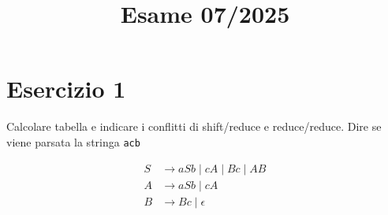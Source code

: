 \endofdump

\usetikzlibrary{external}
\tikzexternalize[prefix=tikz/]

\title{Esame 07/2025}


\maketitle
\section{Esercizio 1}
Calcolare tabella e indicare i conflitti di shift/reduce e reduce/reduce. Dire se viene parsata la stringa \verb|acb|
\vskip3mm

\begin{align*}
	S & \rightarrow aSb \mid cA \mid Bc \mid AB \\
	A & \rightarrow aSb \mid cA                 \\
	B & \rightarrow Bc \mid \epsilon            \\
\end{align*}

